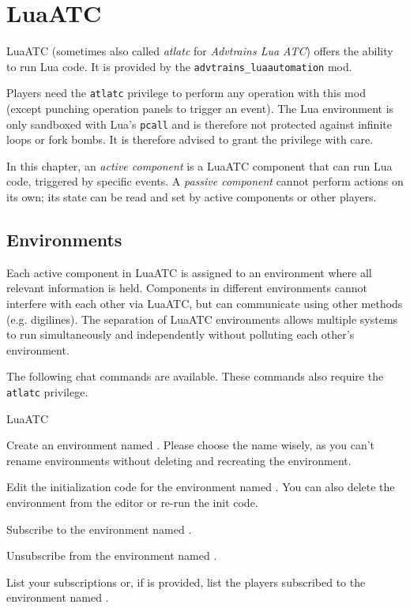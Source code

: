 \section{LuaATC}\label{s:luaatc}

LuaATC (sometimes also called \textit{atlatc} for \textit{Advtrains Lua ATC}) offers the ability to run Lua code. It is provided by the \texttt{advtrains\_luaautomation} mod.

Players need the \texttt{atlatc} privilege to perform any operation with this mod (except punching operation panels to trigger an event). The Lua environment is only sandboxed with Lua's \texttt{pcall} and is therefore not protected against infinite loops or fork bombs. It is therefore advised to grant the privilege with care.

In this chapter, an \textit{active component} is a LuaATC component that can run Lua code, triggered by specific events. A \textit{passive component} cannot perform actions on its own; its state can be read and set by active components or other players.

\subsection{Environments}

Each active component in LuaATC is assigned to an environment where all relevant information is held. Components in different environments cannot interfere with each other via LuaATC, but can communicate using other methods (e.g. digilines). The separation of LuaATC environments allows multiple systems to run simultaneously and independently without polluting each other's environment.

The following chat commands are available. These commands also require the \texttt{atlatc} privilege.

\begin{apidoc}{LuaATC}
\item {} Create an environment named . Please choose the name wisely, as you can't rename environments without deleting and recreating the environment.
\item {} Edit the initialization code for the environment named . You can also delete the environment from the editor or re-run the init code.
\item {} Subscribe to the environment named .
\item {} Unsubscribe from the environment named .
\item {} List your subscriptions or, if  is provided, list the players subscribed to the environment named .
\end{apidoc}

